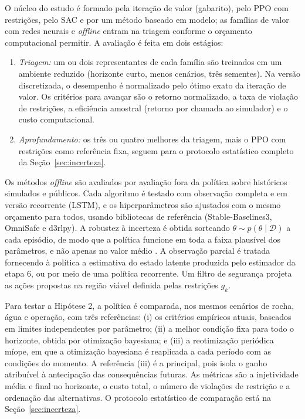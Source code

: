 \documentclass[10pt,a4paper]{article}
\begin{document}
O núcleo do estudo é formado pela iteração de valor (gabarito), pelo PPO com restrições, pelo
SAC e por um método baseado em modelo; as famílias de valor com redes neurais e \textit{offline}
entram na triagem conforme o orçamento computacional permitir. A avaliação é feita em dois estágios:
\begin{enumerate}[label=(\alph*)]
  \item \textit{Triagem:} um ou dois representantes de cada família são treinados em um
        ambiente reduzido (horizonte curto, menos cenários, três sementes). Na versão
        discretizada, o desempenho é normalizado pelo ótimo exato da iteração de valor. Os
        critérios para avançar são o retorno normalizado, a taxa de violação de
        restrições, a eficiência amostral (retorno por chamada ao simulador) e o custo
        computacional.
  \item \textit{Aprofundamento:} os três ou quatro melhores da triagem, mais o PPO com
        restrições como referência fixa, seguem para o protocolo estatístico completo da
        Seção~\ref{sec:incerteza}.
\end{enumerate}
Os métodos \textit{offline} são avaliados por avaliação
fora da política sobre históricos simulados e públicos. Cada algoritmo é testado com
observação completa e em versão recorrente (LSTM), e os hiperparâmetros são ajustados com o
mesmo orçamento para todos, usando bibliotecas de referência (Stable-Baselines3, OmniSafe e
d3rlpy). A
robustez à incerteza é obtida sorteando $\theta \sim p(\theta\mid\mathcal{D})$ a cada
episódio, de modo que a política funcione em toda a faixa plausível dos parâmetros, e não
apenas no valor médio \cite{nasir2022}. A observação parcial é tratada fornecendo à
política a estimativa do estado latente produzida pelo estimador da etapa 6, ou por meio
de uma política recorrente. Um filtro de segurança projeta as ações propostas na região
viável definida pelas restrições $g_k$.

Para testar a Hipótese 2, a política é comparada, nos mesmos cenários de rocha, água e operação,
com três referências: (i) os critérios empíricos atuais, baseados em limites
independentes por parâmetro; (ii) a melhor condição fixa para todo o horizonte, obtida por
otimização bayesiana; e (iii) a reotimização periódica míope, em que a otimização
bayesiana é reaplicada a cada período com as condições do momento. A referência (iii) é a
principal, pois isola o ganho atribuível à antecipação das consequências futuras. As
métricas são a injetividade média e final no horizonte, o custo total, o número de
violações de restrição e a ordenação das alternativas. O protocolo estatístico de
comparação está na Seção~\ref{sec:incerteza}.
\end{document}
